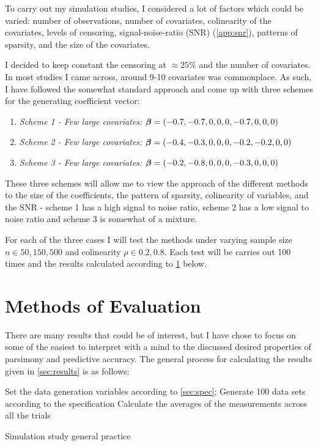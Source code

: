 To carry out my simulation studies, I considered a lot of factors which could be varied: number of observations, number of covariates, colinearity of the covariates, levels of censoring, signal-noise-ratio (SNR) (\see \cref{app:snr}), patterns of sparsity, and the size of the covariates.

I decided to keep constant the censoring at $\approx25\%$ and the number of covariates. In most studies I came across, around 9-10 covariates was commonplace. As such, I have followed the somewhat standard approach and come up with three schemes for the generating coefficient vector:

\begin{enumerate}
    \item \emph{Scheme 1 - Few large covariates:} $\boldsymbol{\beta} = (-0.7,-0.7,0,0,0,-0.7,0,0,0)$ 
    \item \emph{Scheme 2 - Few large covariates:} $\boldsymbol{\beta} = (-0.4,-0.3,0,0,0,-0.2,-0.2,0,0)$ 
    \item \emph{Scheme 3 - Few large covariates:} $\boldsymbol{\beta} = (-0.2,-0.8,0,0,0,-0.3,0,0,0)$ 
\end{enumerate}

These three schemes will allow me to view the approach of the different methods to the size of the coefficients, the pattern of sparsity, colinearity of variables, and the SNR - scheme 1 has a high signal to noise ratio, scheme 2 has a low signal to noise ratio and scheme 3 is somewhat of a mixture.

For each of the three cases I will test the methods under varying sample size $n\in{50,150,500}$ and colinearity $\rho\in{0.2,0.8}$. Each test will be carries out 100 times and the results calculated according to \cref{sec:methods} below.

\section{Methods of Evaluation}\label{sec:methods}

There are many results that could be of interest, but I have chose to focus on some of the easiest to interpret with a mind to the discussed desired properties of parsimony and predictive accuracy. The general process for calculating the results given in \cref{sec:results} is as follows:

\begin{algorithm}[H]
    Set the data generation variables according to \cref{sec:spec};
    Generate 100 data sets according to the specification\;
     {
        Calculate the averages of the measurements across all the trials\;
    }
    \caption{Simulation study general practice}\label{alg:sim-study-process}
\end{algorithm}

